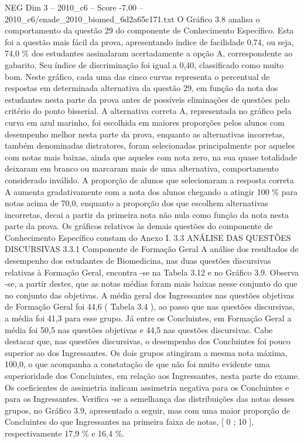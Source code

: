 \begin{textsample}{NEG Dim 3 – 2010\_c6 – Score -7.00 – 2010\_c6/enade\_2010\_biomed\_6d2a65c171.txt}
O Gráfico 3.8 analisa o comportamento da questão 29 do componente de Conhecimento Específico.
Esta foi a questão mais fácil da prova, apresentando índice de facilidade 0,74, ou seja, 74,0 \% dos estudantes assinalaram acertadamente a opção A, correspondente ao gabarito.
Seu índice de discriminação foi igual a 0,40, classificado como muito bom.
Neste gráfico, cada uma das cinco curvas representa o percentual de respostas em determinada alternativa da questão 29, em função da nota dos estudantes nesta parte da prova antes de possíveis eliminações de questões pelo critério do ponto bisserial.
A alternativa correta A, representada no gráfico pela curva em azul marinho, foi escolhida em maiores proporções pelos alunos com desempenho melhor nesta parte da prova, enquanto as alternativas incorretas, também denominadas distratores, foram selecionadas principalmente por aqueles com notas mais baixas, ainda que aqueles com nota zero, na sua quase totalidade deixaram em branco ou marcaram mais de uma alternativa, comportamento considerado inválido.
A proporção de alunos que selecionaram a resposta correta A aumenta gradativamente com a nota dos alunos chegando a atingir 100 \% para notas acima de 70,0, enquanto a proporção dos que escolhem alternativas incorretas, decai a partir da primeira nota não nula como função da nota nesta parte da prova.
Os gráficos relativos às demais questões do componente de Conhecimento Específico constam do Anexo I. 3.3 ANÁLISE DAS QUESTÕES DISCURSIVAS 3.3.1 Componente de Formação Geral A análise dos resultados de desempenho dos estudantes de Biomedicina, nas duas questões discursivas relativas à Formação Geral, encontra -se na Tabela 3.12 e no Gráfico 3.9.
Observa -se, a partir destes, que as notas médias foram mais baixas nesse conjunto do que no conjunto das objetivas.
A média geral dos Ingressantes nas questões objetivas de Formação Geral foi 44,6 ( Tabela 3.4 ), ao passo que nas questões discursivas, a média foi 41,3 para esse grupo.
Já entre os Concluintes, em Formação Geral a média foi 50,5 nas questões objetivas e 44,5 nas questões discursivas.
Cabe destacar que, nas questões discursivas, o desempenho dos Concluintes foi pouco superior ao dos Ingressantes.
Os dois grupos atingiram a mesma nota máxima, 100,0, o que acompanha a constatação de que não foi muito evidente uma superioridade dos Concluintes, em relação aos Ingressantes, nesta parte do exame.
Os coeficientes de assimetria indicam assimetria negativa para os Concluintes e para os Ingressantes.
Verifica -se a semelhança das distribuições das notas desses grupos, no Gráfico 3.9, apresentado a seguir, mas com uma maior proporção de Concluintes do que Ingressantes na primeira faixa de notas, [ 0 ; 10 ], respectivamente 17,9 \% e 16,4 \%.

\end{textsample}
